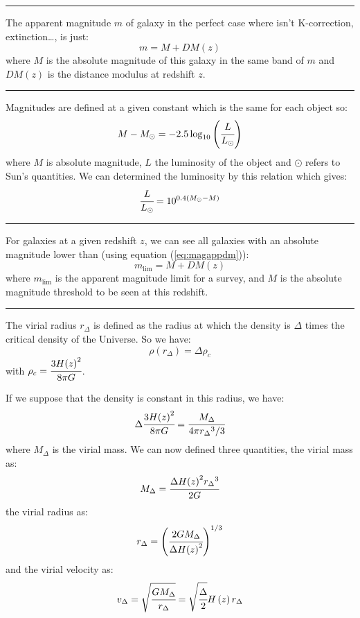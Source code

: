 \noindent\rule{\linewidth}{1pt}
%
The apparent magnitude $m$ of galaxy in the perfect case where isn't
K-correction, extinction\ldots, is just:
%
\begin{equation}\label{eq:magappdm}
	m=M+DM\left({z}\right)%
\end{equation}
%
where $M$ is the absolute magnitude of this galaxy in the same band of $m$ and
$DM(z)$ is the distance modulus at redshift $z$.

\noindent\rule{\linewidth}{1pt}
%
Magnitudes are defined at a given constant which is the same for each object
so:
%
\begin{equation}
	M-M_\odot=-2.5\log_{10}\left(\cfrac{L}{L_\odot}\right)%
\end{equation}
%
where $M$ is absolute magnitude, $L$ the luminosity of the object and $\odot$
refers to Sun's quantities. We can determined the luminosity by this relation
which gives:
%
\begin{equation}
	\cfrac{L}{L_\odot}=10^{0.4\left({M_\odot-M}\right)}
\end{equation}

\noindent\rule{\linewidth}{1pt}
%
For galaxies at a given redshift $z$, we can see all galaxies with an absolute
magnitude lower than (using equation (\ref{eq:magappdm})):
%
\begin{equation}
    m_{\lim}=M+DM\left({z}\right)%
\end{equation}
%
where $m_{\mathrm{\lim}}$ is the apparent magnitude limit for a survey, and $M$
is the absolute magnitude threshold to be seen at this redshift.

\noindent\rule{\linewidth}{1pt}
%
The virial radius $r_\Delta$ is defined as the radius at which the density is
$\Delta$ times the critical density of the Universe. So we have:
%
\begin{equation}\label{eq:radcrit}
	\rho\left({r_\Delta}\right)=\Delta\rho_c
\end{equation}
%
with $\rho_c=\cfrac{3H{\left({z}\right)}^2}{8\pi{G}}$.

If we suppose that the density is constant in this radius, we have:
%
\begin{equation}
	\Delta\cfrac{3H{\left({z}\right)}^2}{8\pi{G}} =
    \cfrac{M_\Delta}{4\pi{r_\Delta}^3/3}
\end{equation}
%
where $M_\Delta$ is the virial mass. We can now defined three quantities, the
virial mass as:
%
\begin{equation}
	M_\Delta=\cfrac{\Delta{H{\left({z}\right)}^2{r_\Delta}^3}}{2G}
\end{equation}
%
the virial radius as:
%
\begin{equation}
    r_\Delta={\left(\cfrac{2 G M_\Delta}
    {\Delta{H{\left({z}\right)}^2}}\right)}^{1/3}
\end{equation}
%
and the virial velocity as:
%
\begin{equation}
	v_\Delta=\sqrt{\cfrac{G M_\Delta}{r_\Delta}}=\sqrt{\cfrac{\Delta}{2}} H\left({z}\right){r_\Delta}
\end{equation}

